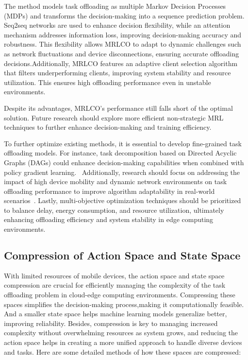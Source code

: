 \documentclass[journal]{IEEEtran}
\begin{document}
The method models task offloading as multiple Markov Decision Processes (MDPs) and transforms the decision-making into a sequence prediction problem. Seq2seq networks are used to enhance decision flexibility, while an attention mechanism addresses information loss, improving decision-making accuracy and robustness. This flexibility allows MRLCO to adapt to dynamic challenges such as network fluctuations and device disconnections, ensuring accurate offloading decisions.Additionally, MRLCO features an adaptive client selection algorithm that filters underperforming clients, improving system stability and resource utilization. This ensures high offloading performance even in unstable environments.

Despite its advantages, MRLCO's performance still falls short of the optimal solution. Future research should explore more efficient non-strategic MRL techniques to further enhance decision-making and training efficiency.~\cite{zhou05}


To further optimize existing methods, it is essential to develop fine-grained task offloading models. For instance, task decomposition based on Directed Acyclic Graphs (DAGs) could enhance decision-making capabilities when combined with policy gradient learning.~\cite{zhou03} Additionally, research should focus on addressing the impact of high device mobility and dynamic network environments on task offloading performance to improve algorithm adaptability in real-world scenarios~\cite{zhou01, zhou02}. Lastly, multi-objective optimization techniques should be prioritized to balance delay, energy consumption, and resource utilization, ultimately enhancing offloading efficiency and system stability in edge computing environments.~\cite{zhou03}

\subsection{Compression of Action Space and State Space}

With limited resources of mobile devices, the action space and state space compression are crucial for efficiently managing the complexity of the task offloading problem in cloud-edge computing environments. Compressing these spaces simplifies the decision-making process,making it computationally feasible. And a smaller state space helps machine learning models generalize better, improving reliability. Besides, compression is key to managing increased complexity without overwhelming resources as system grows, and reducing the action space helps in creating a more unified approach to handle diverse devices and tasks. Here are some detailed methods of how these spaces are compressed:
\end{document}
